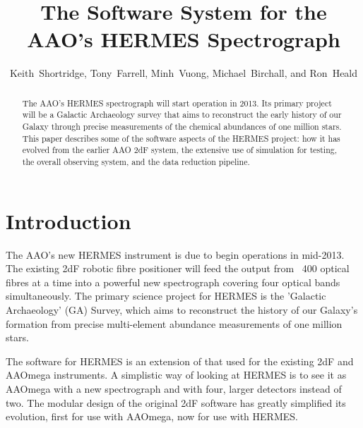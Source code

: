 
\resetcounters





\title{The Software System for the AAO's HERMES Spectrograph}
\author{Keith~Shortridge, Tony~Farrell, Minh~Vuong, Michael~Birchall, and Ron~Heald
}


\begin{abstract}
The AAO's HERMES spectrograph will start operation in 2013. Its primary project will be a Galactic Archaeology survey that aims to reconstruct the early history of our Galaxy through precise measurements of the chemical abundances of one million stars. This paper describes some of the software aspects of the HERMES project: how it has evolved from the earlier AAO 2dF system, the extensive use of simulation for testing, the overall observing system, and the data reduction pipeline.
\end{abstract}

\section{Introduction}

The AAO's new HERMES instrument \citep{Hermes_2010} is due to begin operations in mid-2013. The existing 2dF robotic fibre positioner will feed the output from ~400 optical fibres at a time into a powerful new spectrograph covering four optical bands simultaneously. The primary science project for HERMES is the 'Galactic Archaeology' (GA) Survey, which aims to reconstruct the history of our Galaxy's formation from precise multi-element abundance measurements of one million stars.

The software for HERMES is an extension of that used for the existing 2dF and AAOmega instruments. A simplistic way of looking at HERMES is to see it as AAOmega with a new spectrograph and with four, larger detectors instead of two. The modular design of the original 2dF software has greatly simplified its evolution, first for use with AAOmega, now for use with HERMES.

